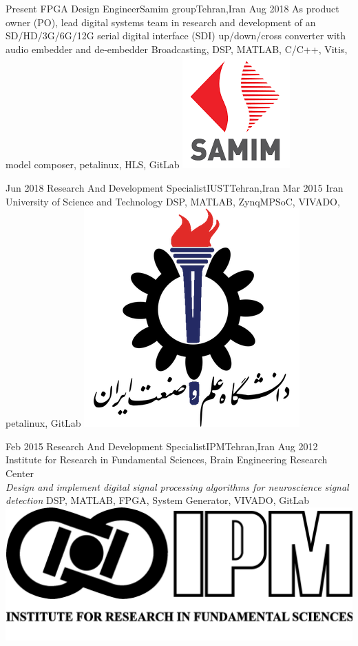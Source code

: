 
\begin{experiences}

  \experience
  {Present} {FPGA Design Engineer}{Samim group}{Tehran,Iran}
  {Aug 2018} {
    As product owner (PO), lead digital systems team in research and development of an 
    SD/HD/3G/6G/12G serial digital interface (SDI) up/down/cross converter with audio 
    embedder and de-embedder
  }
  {Broadcasting, DSP, MATLAB, C/C++, Vitis, model composer, petalinux, HLS, GitLab}
  {\includegraphics[scale=0.2]{graphics/samim_logo}}

  \emptySeparator

  \experience
  {Jun 2018} {Research And Development Specialist}{IUST}{Tehran,Iran}
  {Mar 2015} {
    Iran University of Science and Technology
  }
  {DSP, MATLAB, ZynqMPSoC, VIVADO, petalinux, GitLab}
  {\includegraphics[scale=0.12]{graphics/IUST_logo_color}}

  \emptySeparator

  \experience
  {Feb 2015} {Research And Development Specialist}{IPM}{Tehran,Iran}
  {Aug 2012} {
    Institute for Research in Fundamental Sciences, Brain Engineering Research Center\\
    \emph{Design and implement digital signal processing algorithms for neuroscience signal detection}
  }
  {DSP, MATLAB, FPGA, System Generator, VIVADO, GitLab}
  {\includegraphics[scale=0.025]{graphics/IPM_logo}}


\end{experiences}
